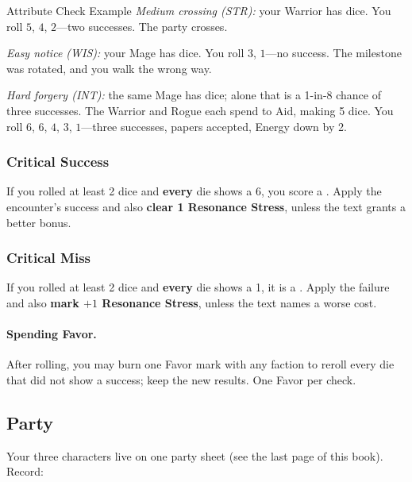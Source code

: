 \begin{rpgbox}{Attribute Check Example}
    \textit{Medium crossing (STR):} your Warrior has  dice. You roll $5$, $4$, $2$---two successes. The party crosses.

    \textit{Easy notice (WIS):} your Mage has  dice. You roll $3$, $1$---no success. The milestone was rotated, and you walk the wrong way.

    \textit{Hard forgery (INT):} the same Mage has  dice; alone that is a 1-in-8 chance of three successes. The Warrior and Rogue each spend  to Aid, making 5 dice. You roll $6$, $6$, $4$, $3$, $1$---three successes, papers accepted, Energy down by 2.
\end{rpgbox}

\subsubsection{Critical Success}
If you rolled at least 2 dice and \textbf{every} die shows a 6, you score a . Apply the encounter's success and also \textbf{clear 1 Resonance Stress}, unless the text grants a better bonus.

\subsubsection{Critical Miss}
If you rolled at least 2 dice and \textbf{every} die shows a 1, it is a . Apply the failure and also \textbf{mark $+1$ Resonance Stress}, unless the text names a worse cost.

\paragraph{Spending Favor.}
After rolling, you may burn one Favor mark with any faction to reroll every die that did not show a success; keep the new results. One Favor per check.

\subsection{Party}

Your three characters live on one party sheet (see the last page of this book). Record:

